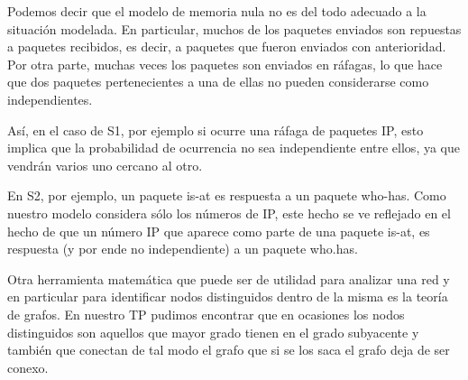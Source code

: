 Podemos decir que el modelo de memoria nula no es del todo adecuado a
la situación modelada. En particular, muchos de los paquetes enviados
son repuestas a paquetes recibidos, es decir, a paquetes que fueron
enviados con anterioridad. Por otra parte, muchas veces los paquetes
son enviados en ráfagas, lo que hace que dos paquetes pertenecientes a
una de ellas no pueden considerarse como independientes.

Así, en el caso de S1, por ejemplo si ocurre una ráfaga de paquetes IP,
esto implica que la probabilidad de ocurrencia no sea independiente entre
ellos, ya que vendrán varios uno cercano al otro.

En S2, por ejemplo, un paquete is-at es respuesta a un paquete
who-has. Como nuestro modelo considera sólo los números de IP, este
hecho se ve reflejado en el hecho de que un número IP que aparece como
parte de una paquete is-at, es respuesta (y por ende no independiente)
a un paquete who.has.


Otra herramienta matemática que puede ser de utilidad para analizar
una red y en particular para identificar nodos distinguidos dentro de
la misma es la teoría de grafos. En nuestro TP pudimos encontrar que
en ocasiones los nodos distinguidos son aquellos que mayor grado tienen
en el grado subyacente y también que conectan de tal modo el grafo que
si se los saca el grafo deja de ser conexo.
